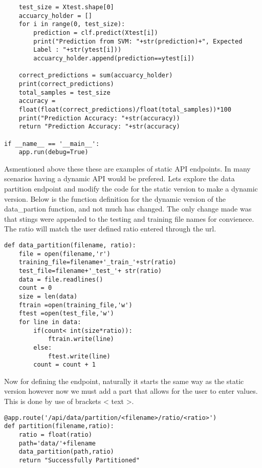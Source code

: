 \begin{lstlisting}
    test_size = Xtest.shape[0]
    accuarcy_holder = []
    for i in range(0, test_size):
        prediction = clf.predict(Xtest[i])
        print("Prediction from SVM: "+str(prediction)+", Expected
        Label : "+str(ytest[i]))
        accuarcy_holder.append(prediction==ytest[i])

    correct_predictions = sum(accuarcy_holder)
    print(correct_predictions)
    total_samples = test_size
    accuracy =
    float(float(correct_predictions)/float(total_samples))*100
    print("Prediction Accuracy: "+str(accuracy))
    return "Prediction Accuracy: "+str(accuracy)

if __name__ == '__main__':
    app.run(debug=True)
\end{lstlisting}

Asmentioned above these these are examples of static API endpoints. In
many scenarios having a dynamic API would be prefered. Lets explore
the data partition endpoint and modify the code for the static version
to make a dynamic version. Below is the function definition for the
dynamic version of the data\_partion function, and not much has
changed. The only change made was that stings were appended to the
testing and training file names for convienece. The ratio will match
the user defined ratio entered through the url.   

\begin{lstlisting}
def data_partition(filename, ratio):
    file = open(filename,'r')
    training_file=filename+'_train_'+str(ratio)
    test_file=filename+'_test_'+ str(ratio)
    data = file.readlines()
    count = 0
    size = len(data)
    ftrain =open(training_file,'w')
    ftest =open(test_file,'w')
    for line in data:
        if(count< int(size*ratio)):
            ftrain.write(line)
        else:
            ftest.write(line)
        count = count + 1 
\end{lstlisting}

Now for defining the endpoint, naturally it starts the same way as the
static version however now we must add a part that allows for the user
to enter values. This is done by use of brackets < text >. 

\begin{lstlisting}
@app.route('/api/data/partition/<filename>/ratio/<ratio>')
def partition(filename,ratio):
    ratio = float(ratio)
    path='data/'+filename
    data_partition(path,ratio)
    return "Successfully Partitioned"
\end{lstlisting}


